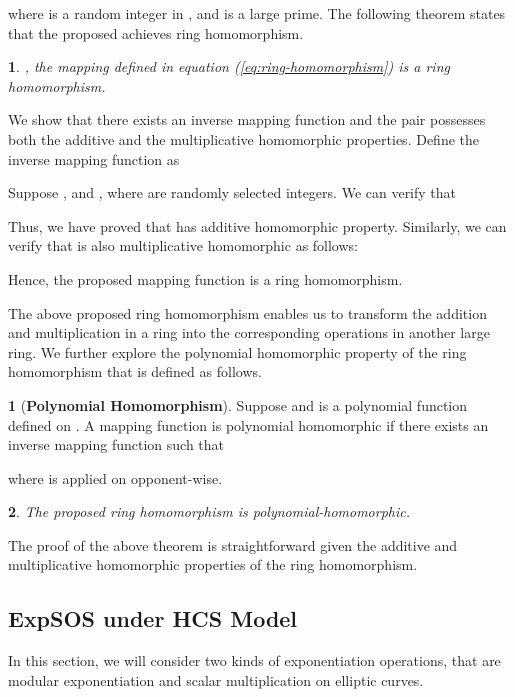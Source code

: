 \documentclass[english,draftcls,onecolumn,11pt]{IEEEtran}
\theoremstyle{definition}
\newtheorem{defn}{\protect\definitionname}
\theoremstyle{plain}
\newtheorem{thm}{\protect\theoremname}
\theoremstyle{plain}
\theoremstyle{definition}
\providecommand{\definitionname}{Definition}
\providecommand{\theoremname}{Theorem}
\begin{document}
where  is a random integer in ,  and 
is a large prime. The following theorem states that the proposed 
achieves ring homomorphism.
\begin{thm}
\label{thm:ring-homo}, the mapping 
defined in equation (\ref{eq:ring-homomorphism}) is a ring homomorphism.\end{thm}
\begin{IEEEproof}
We show that there exists an inverse mapping function 
and the pair  possesses both the additive and the multiplicative
homomorphic properties. Define the inverse mapping function  as



Suppose , 
and , where 
are randomly selected integers. We can verify that 




Thus, we have proved that  has additive homomorphic property.
Similarly, we can verify that  is also multiplicative homomorphic
as follows:




Hence, the proposed mapping function  is a ring
homomorphism.
\end{IEEEproof}
The above proposed ring homomorphism enables us to transform the addition
and multiplication in a ring into the corresponding operations in
another large ring. We further explore the polynomial homomorphic
property of the ring homomorphism that is defined as follows.
\begin{defn}[\textbf{Polynomial Homomorphism}]
 Suppose 
and  is a polynomial function defined on
. A mapping function 
is polynomial homomorphic if there exists an inverse mapping function
 such that 

where  is applied on  opponent-wise. \end{defn}
\begin{thm}
\label{thm:The-proposed-ring}The proposed ring homomorphism 
is polynomial-homomorphic.
\end{thm}
The proof of the above theorem is straightforward given the additive
and multiplicative homomorphic properties of the ring homomorphism.


\subsection{ExpSOS under HCS Model}

In this section, we will consider two kinds of exponentiation operations,
that are modular exponentiation and scalar multiplication on elliptic
curves.
\end{document}
